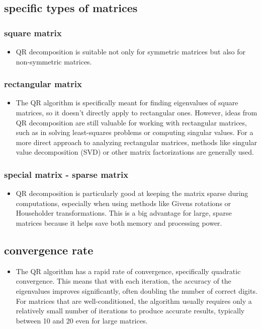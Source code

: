 \documentclass[journal]{IEEEtran}
\begin{document}
\subsection{specific types of matrices}
\subsubsection{square matrix}
\begin{itemize}
    \item QR decomposition is suitable not only for symmetric matrices but also for non-symmetric matrices.\\
\end{itemize}
\subsubsection{rectangular matrix}
\begin{itemize}
    \item The QR algorithm is specifically meant for finding eigenvalues of square matrices, so it doesn't directly apply to rectangular ones. However, ideas from QR decomposition are still valuable for working with rectangular matrices, such as in solving least-squares problems or computing singular values. For a more direct approach to analyzing rectangular matrices, methods like singular value decomposition (SVD) or other matrix factorizations are generally used.\\
\end{itemize}
\subsubsection{special matrix - sparse matrix}
\begin{itemize}
    \item QR decomposition is particularly good at keeping the matrix sparse during computations, especially when using methods like Givens rotations or Householder transformations. This is a big advantage for large, sparse matrices because it helps save both memory and processing power.
\end{itemize}
\subsection{convergence rate}
\begin{itemize}
    \item The QR algorithm has a rapid rate of convergence, specifically quadratic convergence. This means that with each iteration, the accuracy of the eigenvalues improves significantly, often doubling the number of correct digits. For matrices that are well-conditioned, the algorithm usually requires only a relatively small number of iterations to produce accurate results, typically between 10 and 20 even for large matrices.
\end{itemize}
\end{document}
